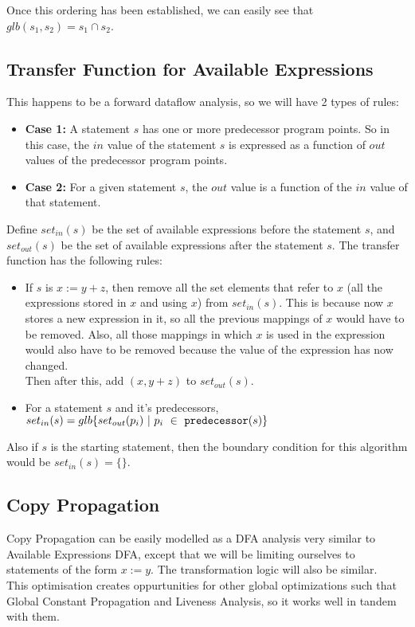 Once this ordering has been established, we can easily see that $glb(s_1,s_2) = s_1 \cap s_2$.

\subsection{Transfer Function for Available Expressions}
This happens to be a forward dataflow analysis, so we will have 2 types of rules:

\begin{itemize}
    \item \textbf{Case 1:} A statement $s$ has one or more predecessor program points. So in this case, the $in$ value of the statement $s$ is expressed as a function of $out$ values of the predecessor program points.
    \item \textbf{Case 2:} For a given statement $s$, the $out$ value is a function of the $in$ value of that statement.
\end{itemize}

Define $set_{in}(s)$ be the set of available expressions before the statement $s$, and $set_{out}(s)$ be the set of available expressions after the statement $s$. The transfer function has the following rules:

\begin{itemize}
    \item If $s$ is $x := y + z$, then remove all the set elements that refer to $x$ (all the expressions stored in $x$ and using $x$) from $set_{in}(s)$. This is because now $x$ stores a new expression in it, so all the previous mappings of $x$ would have to be removed. Also, all those mappings in which $x$ is used in the expression would also have to be removed because the value of the expression has now changed.\\
    Then after this, add $(x,y+z)$ to $set_{out}(s)$.
    \item For a statement $s$ and it's predecessors, $set_{in}(s) = glb\{set_{out}(p_i)~|~p_i~\in~{\tt predecessor}(s)\}$
\end{itemize}

Also if $s$ is the starting statement, then the boundary condition for this algorithm would be $set_{in}(s) = \{\}$.

\subsection{Copy Propagation}
Copy Propagation can be easily modelled as a DFA analysis very similar to Available Expressions DFA, except that we will be limiting ourselves to statements of the form $x := y$. The transformation logic will also be similar.\\

This optimisation creates oppurtunities for other global optimizations such that Global Constant Propagation and Liveness Analysis, so it works well in tandem with them.

